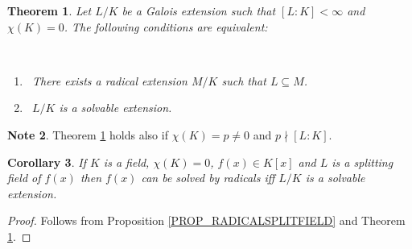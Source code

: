 \documentclass[12pt, letterpaper, oneside]{article}
\theoremstyle{plain}
\newtheorem{theorem}{Theorem}[section]
\newtheorem{corollary}[theorem]{Corollary}
\theoremstyle{definition}
\newtheorem{note}[theorem]{Note}
\newcommand{\benu}{\begin{enumerate}}
\newcommand{\eenu}{\end{enumerate}}
\newcommand{\vs}{\vskip 5mm}
\begin{document}
\begin{theorem}
\label{THM_RADICALVSSOLVABLEEXT}
Let $L/K$ be a Galois extension such that $[L:K] < \infty$ and $\chi(K) = 0$.
The following conditions are equivalent:
\vskip -13mm

\ 
\benu
\item[(i)] \ There exists a radical extension $M/K$ such that $L\subseteq M$. 
\item[(ii)] \ $L/K$ is a solvable extension. 
\eenu
\end{theorem}

\vs

\begin{note}
Theorem \ref{THM_RADICALVSSOLVABLEEXT} holds also if $\chi(K) = p \neq 0$ and 
$p\nmid [L:K]$. 
\end{note}


\vs\vs


\begin{corollary}
\label{COR_SOLGALSOLVRADPOLY}
If $K$ is a field, $\chi(K) = 0$,  $f(x)\in K[x]$  and $L$ is a splitting field of $f(x)$ then 
$f(x)$ can be solved by radicals iff $L/K$ is a solvable extension.   
\end{corollary}


\vs

\begin{proof}
Follows from Proposition \ref{PROP_RADICALSPLITFIELD} and 
Theorem \ref{THM_RADICALVSSOLVABLEEXT}. 
\end{proof}
\end{document}
